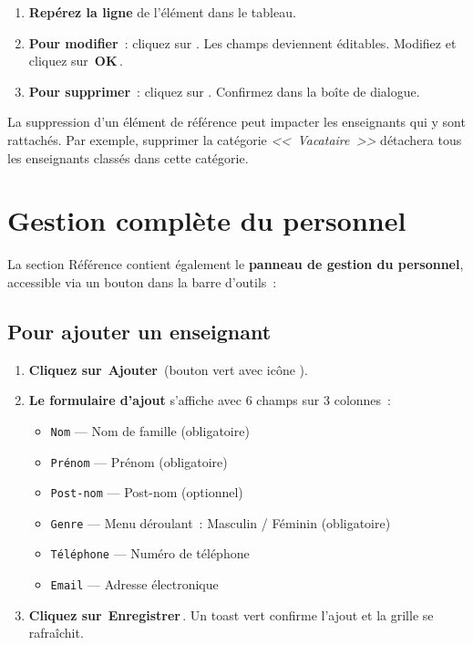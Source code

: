 \documentclass[12pt,a4paper]{report}
\newcommand{\bouton}[1]{{\colorbox{emerald}{\small\sffamily\bfseries\color{white}\,#1\,}}}
\newcommand{\champ}[1]{\texttt{\color{violet}#1}}
\begin{document}
\begin{etape}[title=Proc\'edure : Modifier / Supprimer]
\begin{enumerate}[leftmargin=1.5cm,label=\textbf{\arabic*.},itemsep=8pt]
  \item \textbf{Rep\'erez la ligne} de l'\'el\'ement dans le tableau.
  \item \textbf{Pour modifier}~: cliquez sur \textcolor{indigo}{\faPen}. Les champs deviennent \'editables. Modifiez et cliquez sur \bouton{OK}.
  \item \textbf{Pour supprimer}~: cliquez sur \textcolor{rose}{\faTrash}. Confirmez dans la bo\^ite de dialogue.
\end{enumerate}
\end{etape}

\begin{attention}
La suppression d'un \'el\'ement de r\'ef\'erence peut impacter les enseignants qui y sont rattach\'es. Par exemple, supprimer la cat\'egorie \textit{<<~Vacataire~>>} d\'etachera tous les enseignants class\'es dans cette cat\'egorie.
\end{attention}

\section{Gestion compl\`ete du personnel}

La section R\'ef\'erence contient \'egalement le \textbf{panneau de gestion du personnel}, accessible via un bouton dans la barre d'outils~:

\subsection{Pour ajouter un enseignant}

\begin{etape}[title=Proc\'edure d\'etaill\'ee : Ajouter un enseignant]
\begin{enumerate}[leftmargin=1.5cm,label=\textbf{\arabic*.},itemsep=10pt]
  \item \textbf{Cliquez sur} \bouton{Ajouter} (bouton vert avec ic\^one \faUserPlus).
  \item \textbf{Le formulaire d'ajout} s'affiche avec 6 champs sur 3 colonnes~:
  \begin{itemize}
    \item \champ{Nom} --- Nom de famille (obligatoire)
    \item \champ{Pr\'enom} --- Pr\'enom (obligatoire)
    \item \champ{Post-nom} --- Post-nom (optionnel)
    \item \champ{Genre} --- Menu d\'eroulant~: Masculin / F\'eminin (obligatoire)
    \item \champ{T\'el\'ephone} --- Num\'ero de t\'el\'ephone
    \item \champ{Email} --- Adresse \'electronique
  \end{itemize}
  \item \textbf{Cliquez sur} \bouton{Enregistrer}. Un toast vert confirme l'ajout et la grille se rafra\^ichit.
\end{enumerate}
\end{etape}
\end{document}
